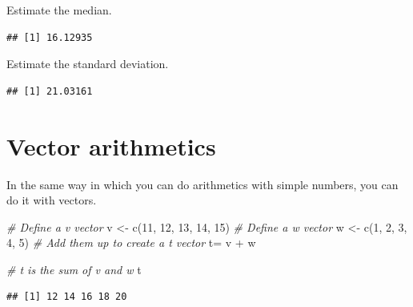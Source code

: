 \documentclass[
]{book}
\newenvironment{Shaded}{\begin{snugshade}}{\end{snugshade}}
\newcommand{\CommentTok}[1]{\textcolor[rgb]{0.56,0.35,0.01}{\textit{#1}}}
\newcommand{\DecValTok}[1]{\textcolor[rgb]{0.00,0.00,0.81}{#1}}
\newcommand{\FunctionTok}[1]{\textcolor[rgb]{0.00,0.00,0.00}{#1}}
\newcommand{\NormalTok}[1]{#1}
\newcommand{\OtherTok}[1]{\textcolor[rgb]{0.56,0.35,0.01}{#1}}
\newcommand{\SpecialCharTok}[1]{\textcolor[rgb]{0.00,0.00,0.00}{#1}}
\begin{document}
Estimate the median.

\begin{Shaded}
\end{Shaded}

\begin{verbatim}
## [1] 16.12935
\end{verbatim}

Estimate the standard deviation.

\begin{Shaded}
\end{Shaded}

\begin{verbatim}
## [1] 21.03161
\end{verbatim}

\hypertarget{vector-arithmetics}{%
\section{Vector arithmetics}\label{vector-arithmetics}}

In the same way in which you can do arithmetics with simple numbers, you can do it with vectors.

\begin{Shaded}
\begin{Highlighting}[]
\CommentTok{\# Define a v vector}
\NormalTok{v }\OtherTok{\textless{}{-}} \FunctionTok{c}\NormalTok{(}\DecValTok{11}\NormalTok{, }\DecValTok{12}\NormalTok{, }\DecValTok{13}\NormalTok{, }\DecValTok{14}\NormalTok{, }\DecValTok{15}\NormalTok{)}
\CommentTok{\# Define a w vector}
\NormalTok{w }\OtherTok{\textless{}{-}} \FunctionTok{c}\NormalTok{(}\DecValTok{1}\NormalTok{, }\DecValTok{2}\NormalTok{, }\DecValTok{3}\NormalTok{, }\DecValTok{4}\NormalTok{, }\DecValTok{5}\NormalTok{)}
\CommentTok{\# Add them up to create a t vector}
\NormalTok{t}\OtherTok{=}\NormalTok{ v }\SpecialCharTok{+}\NormalTok{ w}

\CommentTok{\# t is the sum of v and w}
\NormalTok{t}
\end{Highlighting}
\end{Shaded}

\begin{verbatim}
## [1] 12 14 16 18 20
\end{verbatim}
\end{document}
